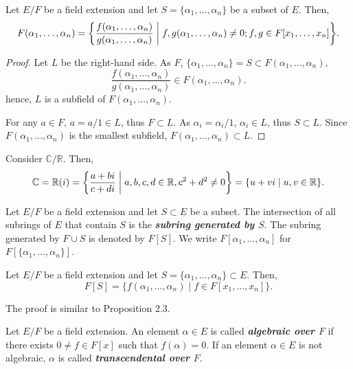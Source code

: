 \documentclass[twoside]{article}
\newcommand\R{\mathbb R}
\newcommand\C{\mathbb C}
\theoremstyle{remark}
\newcommand*\term[1]{\textbf{\textit{\mathversion{bold}#1}}}
\begin{document}
\begin{proposition}
  Let \(E/F\) be a field extension and let \(S = \{\alpha_1, \dots, \alpha_n\}\) be a subset of \(E\). Then,
  \[ F(\alpha_1, \dots, \alpha_n) = \biggl\{ \frac{f(\alpha_1, \dots, \alpha_n)}{g(\alpha_1, \dots, \alpha_n)} \biggm| f,g(\alpha_1, \dots, \alpha_n) \neq 0; f,g \in F[x_1, \dots, x_n] \biggr\}. \]
\end{proposition}

\begin{proof}
  Let \(L\) be the right-hand side. As \(F\), \(\{\alpha_1, \dots, \alpha_n\} = S \subset F(\alpha_1, \dots, \alpha_n),\)
  \[ \frac{f(\alpha_1, \dots, \alpha_n)}{g(\alpha_1, \dots, \alpha_n)} \in F (\alpha_1, \dots, \alpha_n). \]
  hence, \(L\) is a subfield of \(F(\alpha_1, \dots, \alpha_n)\).
  
  For any \(a \in F\), \(a = a/1 \in L\), thus \(F \subset L\). As \(\alpha_i = \alpha_i/1\), \(\alpha_i \in L\), thus \(S \subset L\). Since \(F(\alpha_1, \dots, \alpha_n)\) is the smallest subfield, \(F(\alpha_1, \dots, \alpha_n) \subset L\).
\end{proof}

\begin{example}
  Consider \(\C/\R\). Then,
  \[ \C = \R(i) = \biggl\{ \frac{a+bi}{c+di} \biggm| a,b,c,d \in \R, c^2+d^2 \neq 0 \biggr\} = \{u + vi \mid u,v \in \R\}. \]
\end{example}

\begin{definition}%
  Let \(E/F\) be a field extension and let \(S \subset E\) be a subset. The intersection of all subrings of \(E\) that contain \(S\) is the \term{subring generated by \(S\)}. The subring generated by \(F \cup S\) is denoted by \(F[S]\). We write \(F[\alpha_1, \dots, \alpha_n]\) for \(F[\{\alpha_1, \dots, \alpha_n\}]\).
\end{definition}

\begin{proposition}
  Let \(E/F\) be a field extension and let \(S = \{\alpha_1, \dots, \alpha_n\} \subset E\). Then,
  \[ F[S] = \{f(\alpha_1, \dots, \alpha_n) \mid f \in F[x_1, \dots, x_n]\}. \]
\end{proposition}

The proof is similar to Proposition 2.3.

\begin{definition}%
  Let \(E/F\) be a field extension. An element \(\alpha \in E\) is called \term{algebraic over \(F\)} if there exists \(0 \neq f \in F[x]\) such that \(f(\alpha) = 0\). If an element \(\alpha \in E\) is not algebraic, \(\alpha\) is called \term{transcendental over \(F\)}.
\end{definition}
\end{document}
